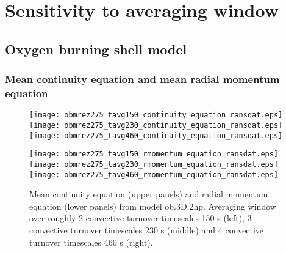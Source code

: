 \documentclass[10pt,paper=a4]{report}
\begin{document}



\newpage

\section{Sensitivity to averaging window}

\subsection{Oxygen burning shell model}

\subsubsection{Mean continuity equation and mean radial momentum equation}

\begin{figure}[!h]
\centerline{
\texttt{[image: obmrez275\_tavg150\_continuity\_equation\_ransdat.eps]}
\texttt{[image: obmrez275\_tavg230\_continuity\_equation\_ransdat.eps]}
\texttt{[image: obmrez275\_tavg460\_continuity\_equation\_ransdat.eps]}}

\centerline{
\texttt{[image: obmrez275\_tavg150\_rmomentum\_equation\_ransdat.eps]}
\texttt{[image: obmrez275\_tavg230\_rmomentum\_equation\_ransdat.eps]}
\texttt{[image: obmrez275\_tavg460\_rmomentum\_equation\_ransdat.eps]}}
\caption{Mean continuity equation (upper panels) and radial momentum equation (lower panels) from model {\sf ob.3D.2hp}. Averaging window over roughly 2 convective turnover timescales 150 s (left), 3 convective turnover timescales 230 s (middle) and 4 convective turnover timescales 460 s (right).}
\end{figure}
\end{document}
